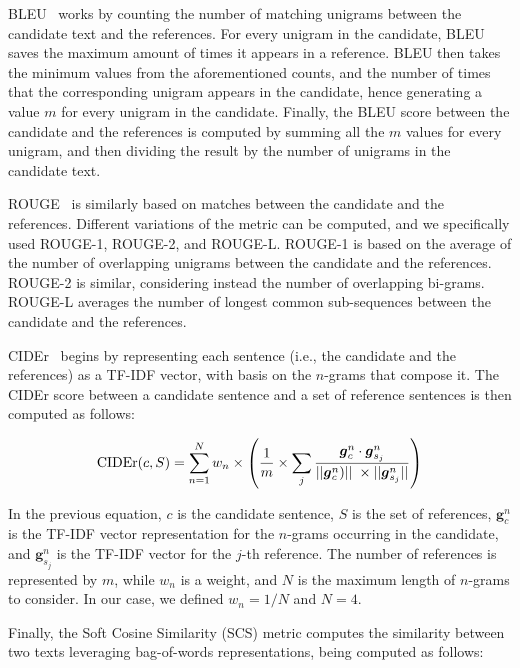 BLEU~\cite{bleu} works by counting the number of matching unigrams between the candidate text and the references. For every unigram in the candidate, BLEU saves the maximum amount of times it appears in a reference. BLEU then takes the minimum values from the aforementioned counts, and the number of times that the corresponding unigram appears in the candidate, hence generating a value $m$ for every unigram in the candidate. Finally, the BLEU score between the candidate and the references is computed by summing all the $m$ values for every unigram, and then dividing the result by the number of unigrams in the candidate text.

ROUGE~\cite{rouge} is similarly based on matches between the candidate and the references. Different variations of the metric can be computed, and we specifically used ROUGE-1, ROUGE-2, and ROUGE-L. ROUGE-1 is based on the average of the number of overlapping unigrams between the candidate and the references. ROUGE-2 is similar, considering instead the number of overlapping bi-grams. ROUGE-L averages the number of longest common sub-sequences between the candidate and the references.

CIDEr~\cite{cider} begins by representing each sentence (i.e., the candidate and the references) as a TF-IDF vector, with basis on the $n$-grams that compose it. The CIDEr score between a candidate sentence and a set of reference sentences is then computed as follows:

\begin{equation}
\mathrm{CIDEr}(c, S) = \sum\limits_{n=1}^N w_n \times \left( \frac{1}{m} \times \sum\limits_{j} \frac{\boldsymbol{g}^n_c \cdot \boldsymbol{g}^n_{s_j}}{||\boldsymbol{g}^n_c)|| \hspace{0.1cm} \times ||\boldsymbol{g}^n_{s_j}||} \right)
\label{eq:cider}
\end{equation}

In the previous equation, $c$ is the candidate sentence, $S$ is the set of references,  $\boldsymbol{g}^n_c$ is the TF-IDF vector representation for the $n$-grams occurring in the candidate, and $\boldsymbol{g}^n_{s_j}$ is the TF-IDF vector for the $j$-th reference. The number of references is represented by $m$, while $w_n$ is a weight, and $N$ is the maximum length of $n$-grams to consider. In our case, we defined $w_n = 1/N$ and $N = 4$.

Finally, the Soft Cosine Similarity (SCS) metric computes the similarity between two texts leveraging bag-of-words representations, being computed as follows:

